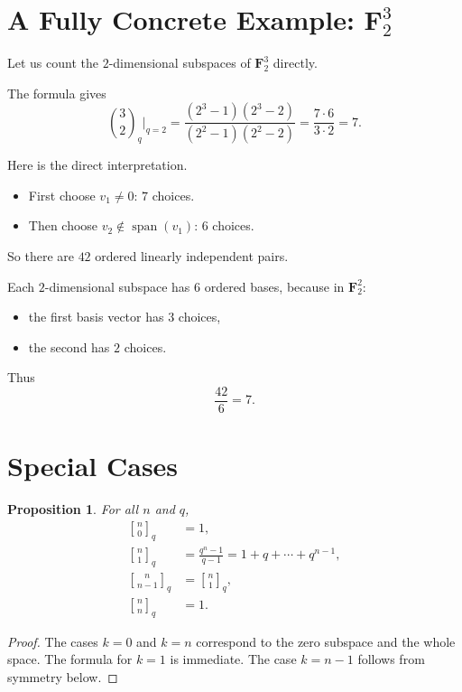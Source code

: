 \documentclass[11pt]{article}
\newtheorem{proposition}[theorem]{Proposition}
\theoremstyle{definition}
\theoremstyle{remark}
\newcommand{\F}{\mathbf{F}}
\newcommand{\Span}{\operatorname{span}}
\newcommand{\qbinom}[2]{\genfrac{[}{]}{0pt}{}{#1}{#2}_q}
\begin{document}
	\section{A Fully Concrete Example: \(\F_2^3\)}
	
	Let us count the \(2\)-dimensional subspaces of \(\F_2^3\) directly.
	
	The formula gives
	\[
	\binom{3}{2}_{q} \Big|_{q=2}
	=
	\frac{(2^3-1)(2^3-2)}{(2^2-1)(2^2-2)}
	=
	\frac{7\cdot 6}{3\cdot 2}
	=
	7.
	\]
	
	Here is the direct interpretation.
	
	\begin{itemize}
		\item First choose \(v_1\neq 0\): \(7\) choices.
		\item Then choose \(v_2\notin \Span(v_1)\): \(6\) choices.
	\end{itemize}
	
	So there are \(42\) ordered linearly independent pairs.
	
	Each \(2\)-dimensional subspace has \(6\) ordered bases, because in \(\F_2^2\):
	\begin{itemize}
		\item the first basis vector has \(3\) choices,
		\item the second has \(2\) choices.
	\end{itemize}
	
	Thus
	\[
	\frac{42}{6}=7.
	\]
	
	\section{Special Cases}
	
	\begin{proposition}
		For all \(n\) and \(q\),
		\begin{align*}
			\qbinom{n}{0} &= 1,\\
			\qbinom{n}{1} &= \frac{q^n-1}{q-1}=1+q+\cdots+q^{n-1},\\
			\qbinom{n}{n-1} &= \qbinom{n}{1},\\
			\qbinom{n}{n} &= 1.
		\end{align*}
	\end{proposition}
	
	\begin{proof}
		The cases \(k=0\) and \(k=n\) correspond to the zero subspace and the whole space. The formula for \(k=1\) is immediate. The case \(k=n-1\) follows from symmetry below.
	\end{proof}
	
\end{document}
